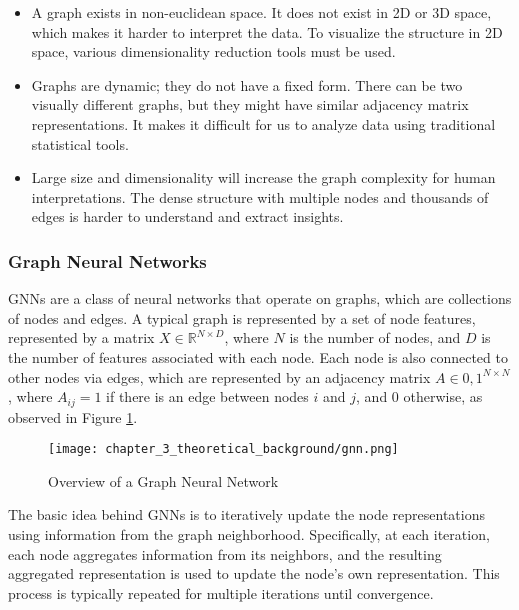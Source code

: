 \begin{itemize}
	
	\item A graph exists in non-euclidean space. It does not exist in 2D or 3D space, which makes it harder to interpret the data. To visualize the structure in 2D space, various dimensionality reduction tools must be used.
	
	\item Graphs are dynamic; they do not have a fixed form. There can be two visually different graphs, but they might have similar adjacency matrix representations. It makes it difficult for us to analyze data using traditional statistical tools.
	
	\item Large size and dimensionality will increase the graph complexity for human interpretations. The dense structure with multiple nodes and thousands of edges is harder to understand and extract insights. 
	
\end{itemize}

\subsubsection{Graph Neural Networks}
\label{subsubsec:3_gnns}

GNNs are a class of neural networks that operate on graphs, which are collections of nodes and edges. A typical graph is represented by a set of node features, represented by a matrix $X \in \mathbb{R}^{N \times D}$, where $N$ is the number of nodes, and $D$ is the number of features associated with each node. Each node is also connected to other nodes via edges, which are represented by an adjacency matrix $A \in {0,1}^{N \times N}$, where $A_{ij} = 1$ if there is an edge between nodes $i$ and $j$, and $0$ otherwise, as observed in Figure \ref{fig:chapter_3_theoretical_background/gnn}.

\begin{figure}[h]
	\centering
	\texttt{[image: chapter\_3\_theoretical\_background/gnn.png]}
	\caption{Overview of a Graph Neural Network}
	\label{fig:chapter_3_theoretical_background/gnn}
\end{figure}

The basic idea behind GNNs is to iteratively update the node representations using information from the graph neighborhood. Specifically, at each iteration, each node aggregates information from its neighbors, and the resulting aggregated representation is used to update the node's own representation. This process is typically repeated for multiple iterations until convergence. %

